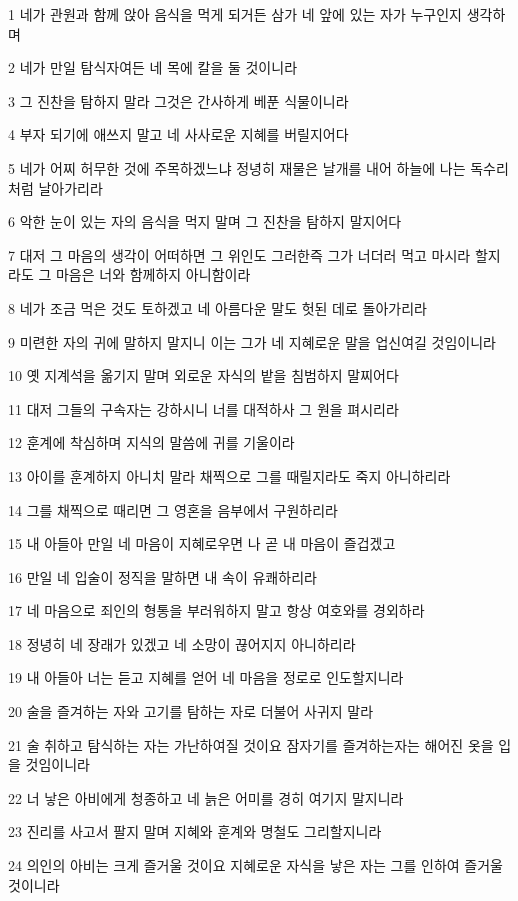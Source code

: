 \par 1 네가 관원과 함께 앉아 음식을 먹게 되거든 삼가 네 앞에 있는 자가 누구인지 생각하며
\par 2 네가 만일 탐식자여든 네 목에 칼을 둘 것이니라
\par 3 그 진찬을 탐하지 말라 그것은 간사하게 베푼 식물이니라
\par 4 부자 되기에 애쓰지 말고 네 사사로운 지혜를 버릴지어다
\par 5 네가 어찌 허무한 것에 주목하겠느냐 정녕히 재물은 날개를 내어 하늘에 나는 독수리처럼 날아가리라
\par 6 악한 눈이 있는 자의 음식을 먹지 말며 그 진찬을 탐하지 말지어다
\par 7 대저 그 마음의 생각이 어떠하면 그 위인도 그러한즉 그가 너더러 먹고 마시라 할지라도 그 마음은 너와 함께하지 아니함이라
\par 8 네가 조금 먹은 것도 토하겠고 네 아름다운 말도 헛된 데로 돌아가리라
\par 9 미련한 자의 귀에 말하지 말지니 이는 그가 네 지혜로운 말을 업신여길 것임이니라
\par 10 옛 지계석을 옮기지 말며 외로운 자식의 밭을 침범하지 말찌어다
\par 11 대저 그들의 구속자는 강하시니 너를 대적하사 그 원을 펴시리라
\par 12 훈계에 착심하며 지식의 말씀에 귀를 기울이라
\par 13 아이를 훈계하지 아니치 말라 채찍으로 그를 때릴지라도 죽지 아니하리라
\par 14 그를 채찍으로 때리면 그 영혼을 음부에서 구원하리라
\par 15 내 아들아 만일 네 마음이 지혜로우면 나 곧 내 마음이 즐겁겠고
\par 16 만일 네 입술이 정직을 말하면 내 속이 유쾌하리라
\par 17 네 마음으로 죄인의 형통을 부러워하지 말고 항상 여호와를 경외하라
\par 18 정녕히 네 장래가 있겠고 네 소망이 끊어지지 아니하리라
\par 19 내 아들아 너는 듣고 지혜를 얻어 네 마음을 정로로 인도할지니라
\par 20 술을 즐겨하는 자와 고기를 탐하는 자로 더불어 사귀지 말라
\par 21 술 취하고 탐식하는 자는 가난하여질 것이요 잠자기를 즐겨하는자는 해어진 옷을 입을 것임이니라
\par 22 너 낳은 아비에게 청종하고 네 늙은 어미를 경히 여기지 말지니라
\par 23 진리를 사고서 팔지 말며 지혜와 훈계와 명철도 그리할지니라
\par 24 의인의 아비는 크게 즐거울 것이요 지혜로운 자식을 낳은 자는 그를 인하여 즐거울 것이니라
